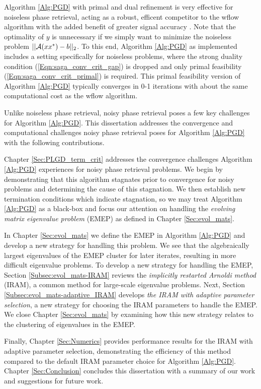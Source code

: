 Algorithm \ref{Alg:PGD} with primal and dual refinement is very effective for noiseless phase retrieval, acting as a robust, efficent competitor to the wflow algorithm with the added benefit of greater signal accuracy \cite[Section 5.1.1, 5.1.3]{DBLP:journals/siamsc/FriedlanderM16}.  Note that the optimality of $y$ is unnecessary if we simply want to minimize the noiseless problem $||{\mathcal A}(xx^*) - b||_2$.  To this end, Algorithm \ref{Alg:PGD} as implemented includes a setting specifically for noiseless problems, where the strong duality condition (\ref{Eqn:saga_conv_crit_gap}) is dropped and only primal feasibility (\ref{Eqn:saga_conv_crit_primal}) is required.  This primal feasibility version of Algorithm \ref{Alg:PGD} typically converges in 0-1 iterations with about the same computational cost as the wflow algorithm.  



Unlike noiseless phase retrieval, noisy phase retrieval poses a few key challenges for Algorithm \ref{Alg:PGD}.
This dissertation addresses the convergence and computational challenges noisy phase retrieval poses for Algorithm \ref{Alg:PGD} with the following contributions.


Chapter \ref{Sec:PLGD_term_crit} addresses the convergence challenges Algorithm \ref{Alg:PGD} experiences for noisy phase retrieval problems.  
We begin by demonstrating that this algorithm stagnates prior to convergence for noisy problems and determining the cause of this stagnation.  
We then establish new termination conditions which indicate stagnation, so we may treat Algorithm \ref{Alg:PGD} as a black-box and focus our attention on handling the \textit{evolving matrix eigenvalue problem} (EMEP) as defined in Chapter \ref{Sec:evol_mats}.


In Chapter \ref{Sec:evol_mats} we define the EMEP in Algorithm \ref{Alg:PGD} and develop a new strategy for handling this problem.
We see that the algebraically largest eigenvalues of the EMEP cluster for later iterates, resulting in more difficult eigenvalue problems.
To develop a new strategy for handling the EMEP, Section \ref{Subsec:evol_mats-IRAM} reviews the \textit{implicitly restarted Arnoldi method} (IRAM), a common method for large-scale eigenvalue problems. 
Next, Section \ref{Subsec:evol_mats-adaptive_IRAM} develops \textit{the IRAM with adaptive parameter selection}, a new strategy for choosing the IRAM parameters to handle the EMEP.  
We close Chapter \ref{Sec:evol_mats} by examining how this new strategy relates to the clustering of eigenvalues in the EMEP.


Finally, Chapter \ref{Sec:Numerics} provides performance results for the IRAM with adaptive parameter selection, demonstrating the efficiency of this method compared to the default IRAM parameter choice for Algorithm \ref{Alg:PGD}.  
Chapter \ref{Sec:Conclusion} concludes this dissertation with a summary of our work and suggestions for future work.




